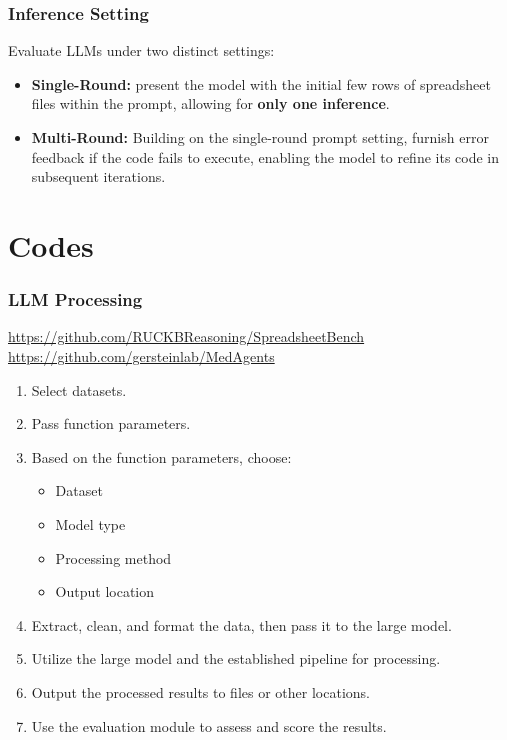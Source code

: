 \documentclass{beamer}
\begin{document}
\begin{frame}
    \frametitle{Inference Setting}
    Evaluate LLMs under two distinct settings:
    \begin{itemize}
        \item \textbf{Single-Round:} present the model with the initial few rows of spreadsheet files within the prompt, allowing for \textbf{only one inference}.
        \item \textbf{Multi-Round:} Building on the single-round prompt setting, furnish error feedback if the code fails to execute, enabling the model to refine its code in subsequent iterations.
    \end{itemize}
\end{frame}

\section{Codes}
\begin{frame}
    \frametitle{LLM Processing}
    \href{https://github.com/RUCKBReasoning/SpreadsheetBench}{https://github.com/RUCKBReasoning/SpreadsheetBench}
    \href{https://github.com/gersteinlab/MedAgents}{https://github.com/gersteinlab/MedAgents}
    \begin{enumerate}
        \item Select datasets.
        \item Pass function parameters.
        \item Based on the function parameters, choose:
        \begin{itemize}
            \item Dataset
            \item Model type
            \item Processing method
            \item Output location
        \end{itemize}
        \item Extract, clean, and format the data, then pass it to the large model.
        \item Utilize the large model and the established pipeline for processing.
        \item Output the processed results to files or other locations.
        \item Use the evaluation module to assess and score the results.
    \end{enumerate}
\end{frame}
\end{document}
